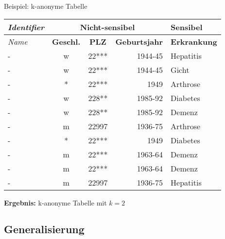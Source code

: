 \begin{frame}{Beispiel: k-anonyme Tabelle}
	\begin{center}
			\begin{tabular}{|l|c|c|r|l|}
		\hline \textit{Identifier} & \multicolumn{3}{c|}{\textbf{Nicht-sensibel}} & \textbf{Sensibel} \\ 
		\hline \textit{Name} & \textbf{Geschl.} & \textbf{PLZ} & \textbf{Geburtsjahr} & \textbf{Erkrankung} \\ \hline
		\hline \rowcolor{svshellblau1!30} 	- & w & 22*** & 1944-45 & Hepatitis \\ 
		\hline \rowcolor{svshellblau1!30}	- & w & 22*** & 1944-45 & Gicht \\ 
		\hline \rowcolor{svsgrau1!30} 		- & * & 22*** & 1949 & Arthrose \\ 
		\hline \rowcolor{svshellblau2!30} 	- & w & 228** & 1985-92 & Diabetes \\
		\hline \rowcolor{svshellblau2!30} 	- & w & 228** & 1985-92 & Demenz \\  
		\hline \rowcolor{white} 			- & m & 22997 & 1936-75 & Arthrose \\ 
		\hline \rowcolor{svsgrau1!30} 		- & * & 22*** & 1949 & Diabetes \\ 
		\hline \rowcolor{svsrot!30} 		- & m & 22*** & 1963-64 & Demenz \\ 
		\hline \rowcolor{svsrot!30} 		- & m & 22*** & 1963-64 & Demenz \\ 
		\hline \rowcolor{white} 			- & m & 22997 & 1936-75 & Hepatitis \\ 
		\hline 
		\end{tabular}
		\vspace{0.5cm}
		\pause

		\textbf{Ergebnis: }k-anonyme Tabelle mit \(k=2\)
	\end{center}
\end{frame}


\subsection{Generalisierung}

